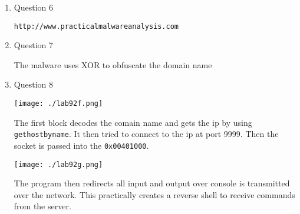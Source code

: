 \documentclass[11pt]{article}
\begin{document}
\begin{enumerate}
\item Question 6
\label{sec:org6d41b3c}

\texttt{http://www.practicalmalwareanalysis.com}

\item Question 7
\label{sec:org45aec4c}

The malware uses XOR to obfuscate the domain name

\item Question 8
\label{sec:orge2c1110}

\begin{center}
\texttt{[image: ./lab92f.png]}
\end{center}

The first block decodes the comain name and gets the ip by using \texttt{gethostbyname}. It then tried to connect to the ip at port 9999. Then the socket is passed into the \texttt{0x00401000}.

\begin{center}
\texttt{[image: ./lab92g.png]}
\end{center}

The program then redirects all input and output over console is transmitted over the network. This practically creates a reverse shell to receive commands from the server.
\end{enumerate}
\end{document}
